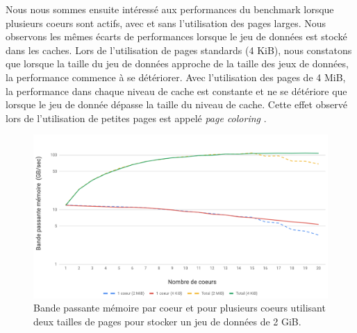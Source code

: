     \begin{table}[]
    \centering
    \caption{Performance du benchmark \textit{DML\_MEM} utilisant deux tailles de pages. La performance dans les 4 niveaux de la hiérarchie mémoire a été mesurée avec le benchmark et le nombre d'évènements \textit{miss} lorsque le jeu de donnée est dans le cache L3.}
    \label{tab:large_page_memory}
    \end{table}
    
    
    Nous nous sommes ensuite intéressé aux performances du benchmark lorsque plusieurs coeurs sont actifs, avec et sans l'utilisation des pages larges. Nous observons les mêmes écarts de performances lorsque le jeu de données est stocké dans les caches. Lors de l'utilisation de pages standards (4 KiB), nous constatons que lorsque la taille du jeu de données approche de la taille des jeux de données, la performance commence à se détériorer. Avec l'utilisation des pages de 4 MiB, la performance dans chaque niveau de cache est constante et ne se détériore que lorsque le jeu de donnée dépasse la taille du niveau de cache. Cette effet observé lors de l'utilisation de petites pages est appelé \textit{page coloring} \cite{Zhang2009}.
  
    \begin{figure}
    \center
    \includegraphics[width=14cm]{images/dml_large_page_bw.png}
    \caption{\label{pic:dml_large_page_bw} Bande passante mémoire par coeur et pour plusieurs coeurs utilisant deux tailles de pages pour stocker un jeu de données de 2 GiB.}
    \end{figure}
    
